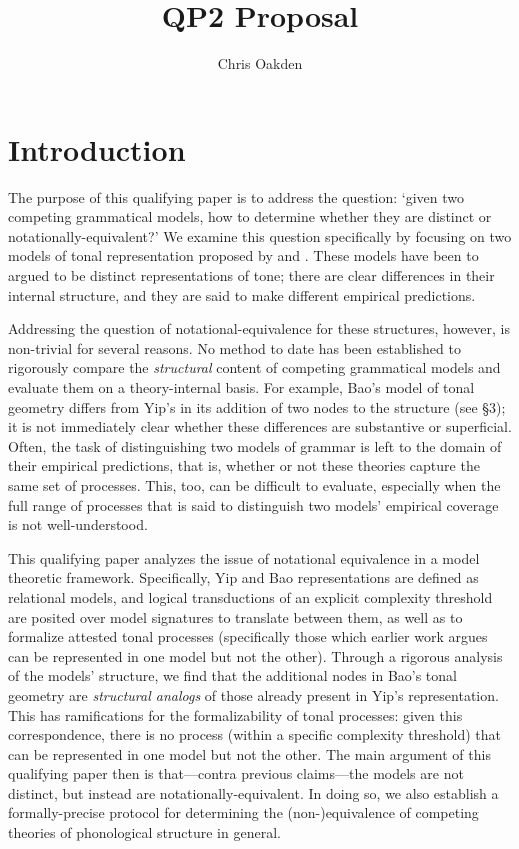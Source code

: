 \documentclass{article}
\title{QP2 Proposal}
\author{Chris Oakden}
\begin{document}
\maketitle
\section{Introduction}
The purpose of this qualifying paper is to address the question: `given two competing grammatical models, how to determine whether they are distinct or notationally-equivalent?' We examine this question specifically by focusing on two models of tonal representation proposed by \citet{Yip1989} and \citet{Bao1990}. These models have been to argued to be distinct representations of tone; there are clear differences in their internal structure, and they are said to make different empirical predictions. \par
Addressing the question of notational-equivalence for these structures, however, is non-trivial for several reasons. No method to date has been established to rigorously compare the \emph{structural} content of competing grammatical models and evaluate them on a theory-internal basis. For example, Bao's model of tonal geometry differs from Yip's in its addition of two nodes to the structure (see \S3); it is not immediately clear whether these differences are substantive or superficial. Often, the task of distinguishing two models of grammar is left to the domain of their empirical predictions, that is, whether or not these theories capture the same set of processes. This, too, can be difficult to evaluate, especially when the full range of processes that is said to distinguish two models' empirical coverage is not well-understood. \par
This qualifying paper analyzes the issue of notational equivalence in a model theoretic framework. Specifically, Yip and Bao representations are defined as relational models, and logical transductions of an explicit complexity threshold are posited over model signatures to translate between them, as well as to formalize attested tonal processes (specifically those which earlier work argues can be represented in one model but not the other). Through a rigorous analysis of the models' structure, we find that the additional nodes in Bao's tonal geometry are \emph{structural analogs} of those already present in Yip's representation. This has ramifications for the formalizability of tonal processes: given this correspondence, there is no process (within a specific complexity threshold) that can be represented in one model but not the other. The main argument of this qualifying paper then is that---contra previous claims---the models are not distinct, but instead are notationally-equivalent. In doing so, we also establish a formally-precise protocol for determining the (non-)equivalence of competing theories of phonological structure in general.\par
\end{document}
